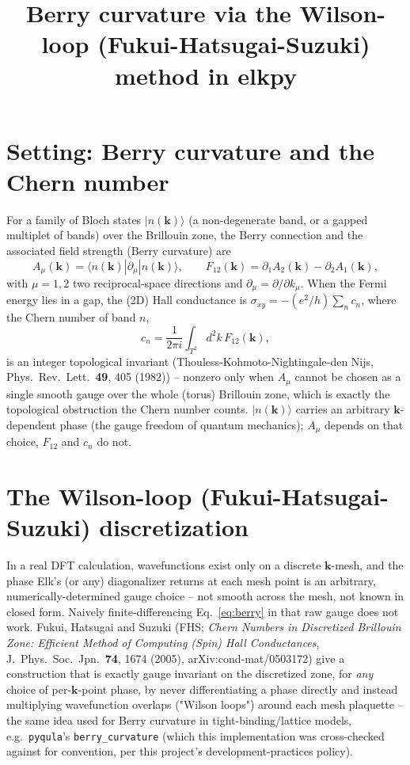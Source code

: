 \documentclass[11pt]{article}
\title{Berry curvature via the Wilson-loop (Fukui-Hatsugai-Suzuki) method in elkpy}
\author{}
\date{}
\begin{document}
\maketitle

\section{Setting: Berry curvature and the Chern number}

For a family of Bloch states $|n(\mathbf k)\rangle$ (a non-degenerate band, or a
gapped multiplet of bands) over the Brillouin zone, the Berry connection and the
associated field strength (Berry curvature) are
\begin{equation}
  A_\mu(\mathbf k) = \langle n(\mathbf k) | \partial_\mu | n(\mathbf k) \rangle, \qquad
  F_{12}(\mathbf k) = \partial_1 A_2(\mathbf k) - \partial_2 A_1(\mathbf k),
  \label{eq:berry}
\end{equation}
with $\mu=1,2$ two reciprocal-space directions and $\partial_\mu = \partial/\partial
k_\mu$. When the Fermi energy lies in a gap, the (2D) Hall conductance is
$\sigma_{xy} = -(e^2/h)\sum_n c_n$, where the Chern number of band $n$,
\begin{equation}
  c_n = \frac{1}{2\pi i} \int_{T^2} d^2k\, F_{12}(\mathbf k),
  \label{eq:chern}
\end{equation}
is an integer topological invariant (Thouless-Kohmoto-Nightingale-den Nijs,
Phys.\ Rev.\ Lett.\ \textbf{49}, 405 (1982)) -- nonzero only when $A_\mu$ cannot be
chosen as a single smooth gauge over the whole (torus) Brillouin zone, which is exactly
the topological obstruction the Chern number counts. $|n(\mathbf k)\rangle$ carries an
arbitrary $\mathbf k$-dependent phase (the gauge freedom of quantum mechanics);
$A_\mu$ depends on that choice, $F_{12}$ and $c_n$ do not.

\section{The Wilson-loop (Fukui-Hatsugai-Suzuki) discretization}

In a real DFT calculation, wavefunctions exist only on a discrete $\mathbf k$-mesh, and
the phase Elk's (or any) diagonalizer returns at each mesh point is an arbitrary,
numerically-determined gauge choice -- not smooth across the mesh, not known in closed
form. Naively finite-differencing Eq.~\eqref{eq:berry} in that raw gauge does not work.
Fukui, Hatsugai and Suzuki (FHS; \emph{Chern Numbers in Discretized Brillouin Zone:
Efficient Method of Computing (Spin) Hall Conductances}, J.\ Phys.\ Soc.\ Jpn.\
\textbf{74}, 1674 (2005), arXiv:cond-mat/0503172) give a construction that is exactly
gauge invariant on the discretized zone, for {\it any} choice of per-$\mathbf k$-point
phase, by never differentiating a phase directly and instead multiplying wavefunction
overlaps ("Wilson loops") around each mesh plaquette -- the same idea used for Berry
curvature in tight-binding/lattice models, e.g.\ \texttt{pyqula}'s
\texttt{berry\_curvature} (which this implementation was cross-checked against for
convention, per this project's development-practices policy).
\end{document}
